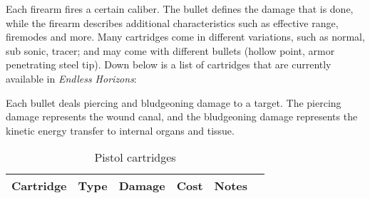 Each firearm fires a certain caliber. The bullet defines the damage that is
done, while the firearm describes additional characteristics such as effective
range, firemodes and more. Many cartridges come in different variations, such as
normal, sub sonic, tracer; and may come with different bullets (hollow point,
armor penetrating steel tip). Down below is a list of cartridges that are
currently available in \emph{Endless Horizons}:

Each bullet deals piercing and bludgeoning damage to a target. The piercing
damage represents the wound canal, and the bludgeoning damage represents the
kinetic energy transfer to internal organs and tissue.

\begin{table}
  \caption{Pistol cartridges}
  \begin{center}
    \begin{tabular}{| l | l | l | l | l | l |}
      \hline
      \textbf{Cartridge}  & \textbf{Type}   & \textbf{Damage} &
      \textbf{Cost}  & \textbf{Notes} \\ \hline


\end{tabular}
\end{center}
\end{table}
